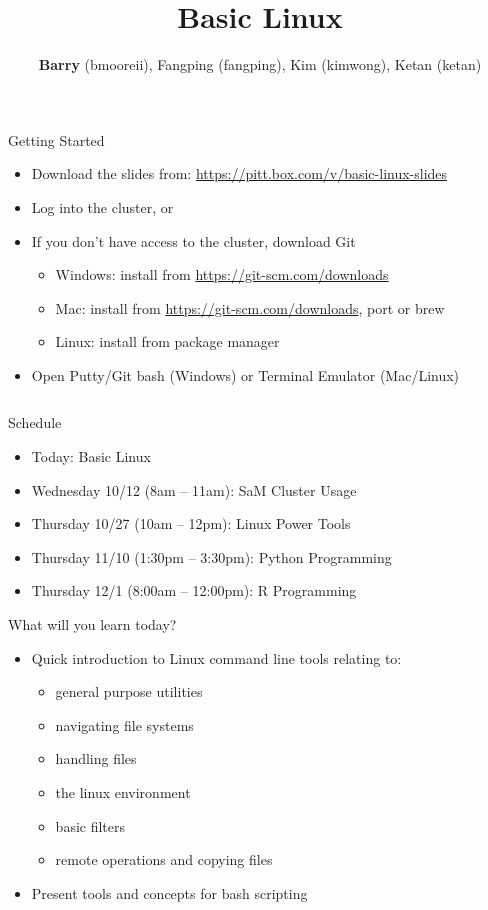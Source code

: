 \documentclass[hyperref={pdfpagelabels=false},12pt]{beamer}
\title[Basic Unix/Linux]{{Basic Linux}}
\author[Basic Unix/Linux]{{\textbf{Barry} (bmooreii), Fangping (fangping), Kim (kimwong), Ketan (ketan)}}
\institute[SaM]{Center for Simulation and Modeling}
\date{}
\newcommand{\myvbutton}[2]{\vfill\hyperlink{#1}{\beamerbutton{{#2}}}}
\begin{document}
\begin{frame}[label=started]{Getting Started}
    \begin{itemize}
        \item Download the slides from: \url{https://pitt.box.com/v/basic-linux-slides}
        \item Log into the cluster, or
        \item If you don't have access to the cluster, download Git
        \begin{itemize}
            \item Windows: install from \url{https://git-scm.com/downloads}
            \item Mac: install from \url{https://git-scm.com/downloads}, port or brew
            \item Linux: install from package manager
        \end{itemize}
        \item Open Putty/Git bash (Windows) or Terminal Emulator (Mac/Linux)
    \end{itemize}
\inputminted[bgcolor=lightgray,linenos,fontsize=\scriptsize]{bash}{code/getting-started.txt}
\myvbutton{navigate}{a clickable button}
\end{frame}

\begin{frame}[plain]
\titlepage
\end{frame}

\begin{frame}{Schedule}
\begin{itemize}
    \item Today: Basic Linux
    \item Wednesday 10/12 (8am -- 11am): SaM Cluster Usage
    \item Thursday 10/27 (10am -- 12pm): Linux Power Tools
    \item Thursday 11/10 (1:30pm -- 3:30pm): Python Programming
    \item Thursday 12/1 (8:00am -- 12:00pm): R Programming
\end{itemize}
\end{frame}

\begin{frame}{What will you learn today?}
    \begin{itemize}
        \item Quick introduction to Linux command line tools relating to:
        \begin{itemize}
            \item general purpose utilities
            \item navigating file systems
            \item handling files
            \item the linux environment
            \item basic filters
            \item remote operations and copying files
        \end{itemize}
        \item Present tools and concepts for bash scripting
    \end{itemize}
\end{frame}
\end{document}
